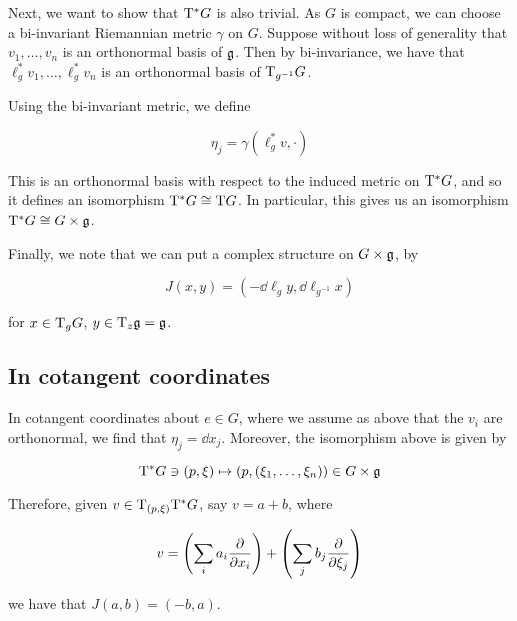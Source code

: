 \documentclass{article}
\begin{document}
Next, we want to show that \(\mathrm{T}^*G\) is also trivial. As \(G\) is compact, we can choose a bi-invariant Riemannian metric \(\gamma\) on \(G\). Suppose without loss of generality that \(v_1, \dots, v_n\) is an orthonormal basis of \(\mathfrak{g}\). Then by bi-invariance, we have that \(\ell_g^*v_1, \dots, \ell_g^*v_n\) is an orthonormal basis of \(\mathrm{T}_{g^{-1}}G\).

Using the bi-invariant metric, we define

\[\eta_j = \gamma(\ell_g^*v, \cdot)\]

This is an orthonormal basis with respect to the induced metric on \(\mathrm{T}^*G\), and so it defines an isomorphism \(\mathrm{T}^*G \cong \mathrm{T} G\). In particular, this gives us an isomorphism \(\mathrm{T}^*G \cong G \times \mathfrak{g}\).

Finally, we note that we can put a complex structure on \(G \times \mathfrak{g}\), by

\[J(x, y) = (-\dd\ell_{g}y, \dd\ell_{g^{-1}} x)\]

for \(x \in \mathrm{T}_gG\), \(y \in \mathrm{T}_z\mathfrak{g} = \mathfrak{g}\).

\subsection{In cotangent coordinates}

In cotangent coordinates about \(e \in G\), where we assume as above that the \(v_i\) are orthonormal, we find that \(\eta_j = \dd x_j\). Moreover, the isomorphism above is given by

\[\mathrm{T}^* G \ni (p, \xi) \mapsto (p, (\xi_1, \dots, \xi_n)) \in G \times \mathfrak{g}\]

Therefore, given \(v \in \mathrm{T}_{(p, \xi)}\mathrm{T}^*G\), say \(v = a + b\), where

\[v = \left(\sum_i a_i \pdv{x_i}\right) + \left(\sum_j b_j \pdv{\xi_j}\right)\]

we have that \(J(a, b) = (-b, a)\).
\end{document}
